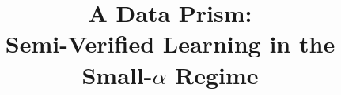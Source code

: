 \documentclass[final,12pt]{colt2018}
\title[A Data Prism]{A Data Prism:\\ Semi-Verified Learning in the Small-$\alpha$ Regime}
\newcommand{\eps}{\epsilon}
\begin{document}
\maketitle








\begin{abstract}
\begin{comment}
We consider a simple model of unreliable or crowdsourced data where there is an underlying set of $n$ binary variables, each ``evaluator'' contributes a (possibly unreliable or adversarial) estimate of the values of some subset of $r$ of the variables, and the learner is given the true value of a \emph{constant} number of variables.   We show that, provided an $\alpha$-fraction of the evaluators are ``good'' (either correct, or with independent noise rate $p < 1/2$), then the true values of a $(1-\eps)$ fraction of the $n$ underlying variables can be deduced as long as $\alpha > 1/(2-2p)^r$.   For example, if each ``good'' worker evaluates a random set of $10$ items and there is no noise in their responses, then accurate recovery is possible provided  the fraction of good evaluators is larger than $1/1024$.  This result is optimal in that if $\alpha \le 1/(2-2p)^r,$ the large dataset can contain no information.   This setting can be viewed as an instance of the  \emph{semi-verified} learning model introduced in~\citep{CSV17}, which explores the tradeoff between the number of items evaluated by each worker and the fraction of ``good'' evaluators.  Our results require the number of evaluators to be extremely large, $ >n^r$, although our algorithm runs in \emph{linear} time, $O_{r,\eps}(n)$, given query access to the large dataset of evaluations.  This setting and results can also be viewed as examining a general class of semi-adversarial CSPs with a planted assignment.

This extreme parameter regime, where the fraction of reliable data is small (inverse exponential in the amount of data provided by each source), is relevant to a number of practical settings.  For example, settings where one has a large dataset of customer preferences, with each customer specifying preferences for a small (constant) number of items, and the goal is to ascertain the preferences of a specific demographic of interest.   Our results show that this large dataset (which lacks demographic information) can be leveraged together with the preferences of the demographic of interest for a \emph{constant} number of randomly selected items, to recover an accurate estimate of the entire set of preferences, even if the  fraction of the original dataset contributed by the demographic of interest is inverse exponential in the number of preferences supplied by each customer.   In this sense, our results can be viewed as a ``data prism'' allowing one to extract the behavior of specific cohorts from a large, mixed, dataset.
\end{comment}


\end{abstract}
\end{document}
